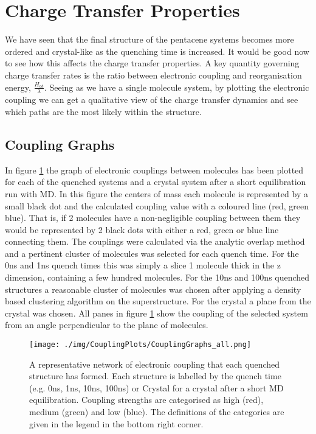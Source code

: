 \section{Charge Transfer Properties}
We have seen that the final structure of the pentacene systems becomes more ordered and crystal-like as the quenching time is increased. It would be good now to see how this affects the charge transfer properties. A key quantity governing charge transfer rates is the ratio between electronic coupling and reorganisation energy, $\frac{H_{ab}}{\lambda}$. Seeing as we have a single molecule system, by plotting the electronic coupling we can get a qualitative view of the charge transfer dynamics and see which paths are the most likely within the structure.
\subsection{Coupling Graphs}
In figure \ref{fig:crystalCouplingGraph} the graph of electronic couplings between molecules has been plotted for each of the quenched systems and a crystal system after a short equilibration run with MD. In this figure the centers of mass each molecule is represented by a small black dot and the calculated coupling value with a coloured line (red, green blue). That is, if 2 molecules have a non-negligible coupling between them they would be represented by 2 black dots with either a red, green or blue line connecting them. The couplings were calculated via the analytic overlap method \cite{gajdos_ultrafast_2014} and a pertinent cluster of molecules was selected for each quench time. For the 0ns and 1ns quench times this was simply a slice 1 molecule thick in the z dimension, containing a few hundred molecules. For the 10ns and 100ns quenched structures a reasonable cluster of molecules was chosen after applying a density based clustering algorithm on the superstructure. For the crystal a plane from the crystal was chosen. All panes in figure \ref{fig:crystalCouplingGraph} show the coupling of the selected system from an angle perpendicular to the plane of molecules.
\begin{figure}
	\texttt{[image: ./img/CouplingPlots/CouplingGraphs\_all.png]}
	\caption{\label{fig:crystalCouplingGraph}A representative network of electronic coupling that each quenched structure has formed. Each structure is labelled by the quench time (e.g. 0ns, 1ns, 10ns, 100ns) or Crystal for a crystal after a short MD equilibration. Coupling strengths are categorised as high (red), medium (green) and low (blue). The definitions of the categories are given in the legend in the bottom right corner.}
\end{figure}
